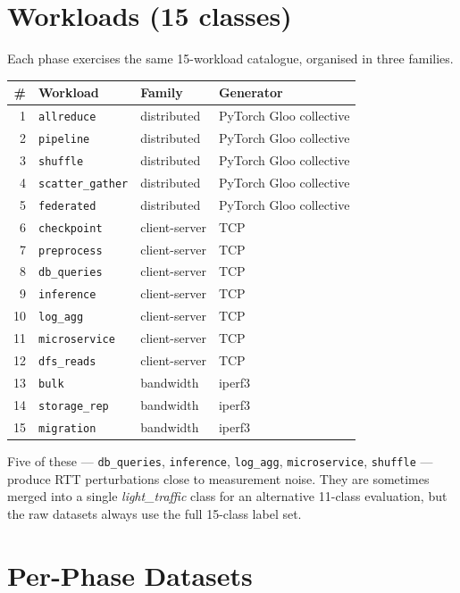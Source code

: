 \documentclass[11pt,a4paper]{article}
\begin{document}
\section{Workloads (15 classes)}

Each phase exercises the same 15-workload catalogue, organised in three
families.

\begin{longtable}{@{}rlll@{}}
\toprule
\textbf{\#} & \textbf{Workload} & \textbf{Family} & \textbf{Generator} \\
\midrule
\endhead
1  & \texttt{allreduce}      & distributed   & PyTorch Gloo collective \\
2  & \texttt{pipeline}       & distributed   & PyTorch Gloo collective \\
3  & \texttt{shuffle}        & distributed   & PyTorch Gloo collective \\
4  & \texttt{scatter\_gather}& distributed   & PyTorch Gloo collective \\
5  & \texttt{federated}      & distributed   & PyTorch Gloo collective \\
6  & \texttt{checkpoint}     & client-server & TCP \\
7  & \texttt{preprocess}     & client-server & TCP \\
8  & \texttt{db\_queries}    & client-server & TCP \\
9  & \texttt{inference}      & client-server & TCP \\
10 & \texttt{log\_agg}       & client-server & TCP \\
11 & \texttt{microservice}   & client-server & TCP \\
12 & \texttt{dfs\_reads}     & client-server & TCP \\
13 & \texttt{bulk}           & bandwidth     & iperf3 \\
14 & \texttt{storage\_rep}   & bandwidth     & iperf3 \\
15 & \texttt{migration}      & bandwidth     & iperf3 \\
\bottomrule
\end{longtable}

Five of these --- \texttt{db\_queries}, \texttt{inference}, \texttt{log\_agg},
\texttt{microservice}, \texttt{shuffle} --- produce RTT perturbations close to
measurement noise. They are sometimes merged into a single \emph{light\_traffic}
class for an alternative 11-class evaluation, but the raw datasets always use
the full 15-class label set.

\section{Per-Phase Datasets}
\end{document}
